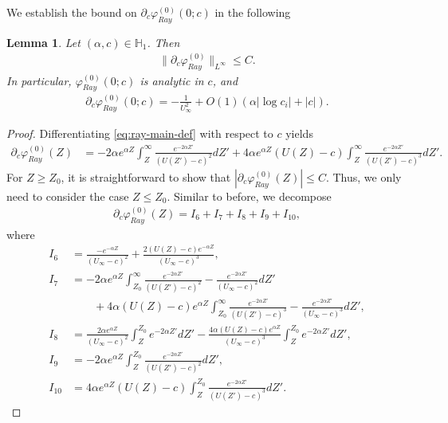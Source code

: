 \documentclass[reqno,11pt]{amsart}
\numberwithin{equation}{section}
\numberwithin{equation}{section}
\theoremstyle{plain}
\newtheorem{lemma}[theorem]{Lemma}
\begin{document}
We establish the bound on $\partial_c\varphi^{(0)}_{Ray}(0;c)$ in the following
\begin{lemma}\label{lmphic}
	Let $(\alpha,c)\in \mathbb{H}_1$. Then
	\begin{align}
		\|\partial_c\varphi_{Ray}^{(0)}\|_{L^\infty}\leq C.\label{phic}
	\end{align} 
In particular, $\varphi^{(0)}_{Ray}(0;c)$ is analytic in $c$, and 
\begin{align}
	\partial_c\varphi^{(0)}_{Ray}(0;c)=-\frac{1}{U_{\infty}^2}+O(1)(\alpha|\log c_i|+|c|).\label{dphic}
\end{align}
\end{lemma}
\begin{proof}
	Differentiating \eqref{eq:ray-main-def} with respect to $c$ yields
\begin{equation}
	\begin{aligned}
	\partial_c\varphi^{(0)}_{Ray}(Z)&=-2\alpha e^{\alpha Z}\int_Z^\infty \frac{e^{-2\alpha Z'}}{(U(Z')-c)^2}d Z'+4\alpha e^{\alpha Z}(U(Z)-c)\int_{Z}^\infty \frac{e^{-2\alpha Z'}}{(U(Z')-c)^3} dZ'.\nonumber
\end{aligned}
\end{equation}
For $Z\geq Z_0$, it is straightforward to show that $|\partial_c\varphi^{(0)}_{Ray}(Z)|\leq C.$ Thus, we only need to consider the case $Z\leq Z_0$. Similar to before, we decompose
\begin{align}
		\partial_c\varphi^{(0)}_{Ray}(Z)=I_6+I_7+I_8+I_9+I_{10},\label{phi1c}
\end{align}
where
\begin{equation}\nonumber
\begin{aligned}
	I_6&=\frac{-e^{-\alpha Z}}{(U_\infty-c)^2}+\frac{2(U(Z)-c)e^{-\alpha Z}}{(U_\infty-c)^3},\\
	I_7&=-2\alpha e^{\alpha Z}\int_{Z_0}^\infty \frac{e^{-2\alpha Z'}}{(U(Z')-c)^2} -\frac{e^{-2\alpha Z'}}{(U_\infty-c)^2}dZ'\\
	&\qquad+4\alpha (U(Z)-c)e^{\alpha Z}\int_{Z_0}^\infty \frac{e^{-2\alpha Z'}}{(U(Z')-c)^3}-\frac{e^{-2\alpha Z'}}{(U_\infty-c)^3} dZ',\\
	I_8&=\frac{2\alpha e^{\alpha Z}}{(U_\infty-c)^2}\int_{Z}^{Z_0}e^{-2\alpha Z'}d Z'-\frac{4\alpha(U(Z)-c)e^{\alpha Z}}{(U_\infty-c)^3}\int_{Z}^{Z_0}e^{-2\alpha Z'}d Z',\\
	I_9&=-2\alpha e^{\alpha Z}\int_{Z}^{Z_0}\frac{e^{-2\alpha Z'}}{(U(Z')-c)^2} dZ',\\
	I_{10}&=4\alpha e^{\alpha Z}(U(Z)-c)\int_{Z}^{Z_0}\frac{e^{-2\alpha Z'}}{(U(Z')-c)^3} dZ'.
\end{aligned}	
\end{equation}


\end{proof}
\end{document}

